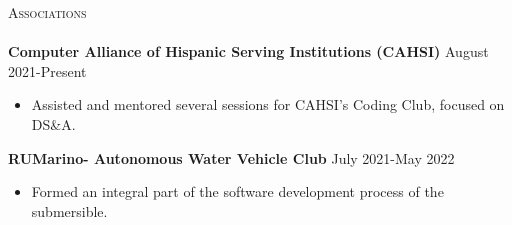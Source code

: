 \documentclass[a4paper]{article}
\newcommand{\lineunder} {
    \vspace*{-8pt} \\
    \hspace*{-18pt} \hrulefill \\
}
\newcommand{\header} [1] {
    {\hspace*{-18pt}\vspace*{6pt} \textsc{#1}}
    \vspace*{-6pt} \lineunder
}
\begin{document}
\header{Associations}

\vspace{-1mm} \textbf{Computer Alliance of Hispanic Serving Institutions (CAHSI)} \hfill August 2021-Present\\
\begin{itemize} \itemsep -1pt
\vspace{-2mm}
\item Assisted and mentored several sessions for CAHSI's Coding Club, focused on DS\&A. \\
\end{itemize}

\vspace{-1mm}
\textbf{RUMarino- Autonomous Water Vehicle Club} \hfill July 2021-May 2022 \\ 
\vspace{-2mm}
\begin{itemize} \itemsep -1pt
\item Formed an integral part of the software development process of the submersible. \\ 
\end{itemize}
 


\ 
\end{document}
